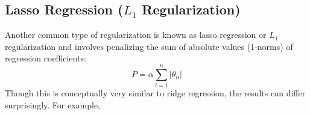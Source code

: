 \subsection*{Lasso Regression ($L_1$ Regularization)}
Another common type of regularization is known as lasso regression or $L_1$ regularization and involves penalizing the sum of absolute values (1-norms) of regression
coefficients:
\begin{equation}
    P=\alpha\sum_{i=1}^{n}|\theta_n|
\end{equation}
Though this is conceptually very similar to ridge regression, the results can differ surprisingly. For example, 